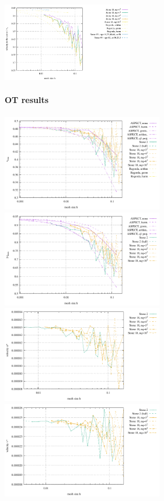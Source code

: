 \begin{center}
\includegraphics[width=5.7cm]{images/stokes_sphere2D/center_velocity_NS}
\end{center}


\newpage
\paragraph{OT results}

\begin{center}
\includegraphics[width=7cm]{images/stokes_sphere2D/vrms_OT}
\includegraphics[width=7cm]{images/stokes_sphere2D/max_vel_OT}\\
\includegraphics[width=7cm]{images/stokes_sphere2D/max_u_OT}
\includegraphics[width=7cm]{images/stokes_sphere2D/max_v_OT}\\

\end{center}
